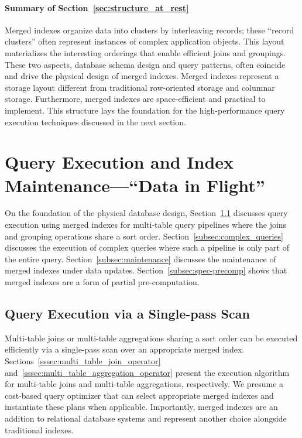 \documentclass[sigconf, pdfa, nonacm]{acmart}
\newcommand\summary[1]{\paragraph{\textbf{#1}}}
\begin{document}
\summary{Summary of Section~\ref{sec:structure_at_rest}}

Merged indexes organize data into clusters by interleaving records; these ``record clusters'' often represent instances of complex application objects. This layout materializes the interesting orderings that enable efficient joins and groupings.
These two aspects, database schema design and query patterns, often coincide and drive the physical design of merged indexes.
Merged indexes represent a storage layout different from traditional row-oriented storage and columnar storage. Furthermore, merged indexes are space-efficient and practical to implement.
This structure lays the foundation for the high-performance query execution techniques discussed in the next section.

\section{Query Execution and Index Maintenance---``Data in Flight''}\label{sec:execution_flight}

On the foundation of the physical database design, Section~\ref{subsec:query_execution_scan} discusses query execution using merged indexes for multi-table query pipelines where the joins and grouping operations share a sort order.
Section~\ref{subsec:complex_queries} discusses the execution of complex queries where such a pipeline is only part of the entire query.
Section~\ref{subsec:maintenance} discusses the maintenance of merged indexes under data updates.
Section~\ref{subsec:spec-precomp} shows that merged indexes are a form of partial pre-computation.

\subsection{Query Execution via a Single-pass Scan}\label{subsec:query_execution_scan} 

Multi-table joins or multi-table aggregations sharing a sort order can be executed efficiently via a single-pass scan over an appropriate merged index.
Sections~\ref{sssec:multi_table_join_operator} and~\ref{sssec:multi_table_aggregation_operator} present the execution algorithm for multi-table joins and multi-table aggregations, respectively.
We presume a cost-based query optimizer that can select appropriate merged indexes and instantiate these plans when applicable.
Importantly, merged indexes are an addition to relational database systems and represent another choice alongside traditional indexes.
\end{document}
